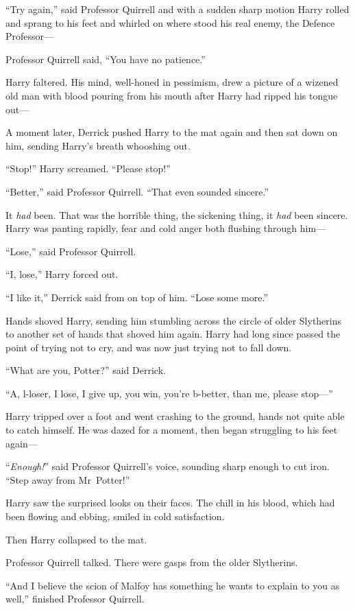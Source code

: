 “Try again,” said Professor Quirrell and with a sudden sharp motion Harry rolled and sprang to his feet and whirled on where stood his real enemy, the Defence Professor—

Professor Quirrell said, “You have no patience.”

Harry faltered. His mind, well-honed in pessimism, drew a picture of a wizened old man with blood pouring from his mouth after Harry had ripped his tongue out—

A moment later, Derrick pushed Harry to the mat again and then sat down on him, sending Harry’s breath whooshing out.

“Stop!” Harry screamed. “Please stop!”

“Better,” said Professor Quirrell. “That even sounded sincere.”

It \emph{had} been. That was the horrible thing, the sickening thing, it \emph{had} been sincere. Harry was panting rapidly, fear and cold anger both flushing through him—

“Lose,” said Professor Quirrell.

“I, lose,” Harry forced out.

“I like it,” Derrick said from on top of him. “Lose some more.”

\later

Hands shoved Harry, sending him stumbling across the circle of older Slytherins to another set of hands that shoved him again. Harry had long since passed the point of trying not to cry, and was now just trying not to fall down.

“What are you, Potter?” said Derrick.

“A, l-loser, I lose, I give up, you win, you’re b-better, than me, please stop—”

Harry tripped over a foot and went crashing to the ground, hands not quite able to catch himself. He was dazed for a moment, then began struggling to his feet again—

“\emph{Enough!}” said Professor Quirrell’s voice, sounding sharp enough to cut iron. “Step away from Mr~Potter!”

Harry saw the surprised looks on their faces. The chill in his blood, which had been flowing and ebbing, smiled in cold satisfaction.

Then Harry collapsed to the mat.

Professor Quirrell talked. There were gasps from the older Slytherins.

“And I believe the scion of Malfoy has something he wants to explain to you as well,” finished Professor Quirrell.

